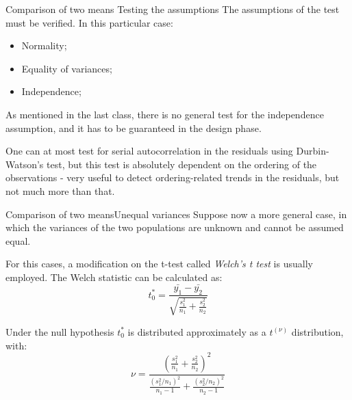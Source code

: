 \begin{frame}
{Comparison of two means}
{Testing the assumptions}
The assumptions of the test must be verified. In this particular case:

{\smaller
\begin{itemize}
  \item Normality;
  \item Equality of variances;
  \item \alert{Independence};
\end{itemize}}
\bigskip

As mentioned in the last class, there is no general test for the independence assumption, and it has to be guaranteed in the design phase.
\bigskip

One can at most test for serial autocorrelation in the residuals using Durbin-Watson's test, but this test is absolutely dependent on the ordering of the observations - very useful to detect ordering-related trends in the residuals, but not much more than that.
\end{frame}

\begin{frame}{Comparison of two means}{Unequal variances}
Suppose now a more general case, in which the variances of the two populations are unknown and cannot be assumed equal.
\bigskip

For this cases, a modification on the t-test called \textit{Welch's t test} is usually employed. The Welch statistic can be calculated as:
\begin{equation*}
  t^*_0 = \frac{\bar{y_1} - \bar{y_2}}{\sqrt{\frac{s_1^2}{n_1} + \frac{s_2^2}{n_2}}}
\end{equation*}
\bigskip

Under the null hypothesis $t^*_0$  is distributed approximately as a $t^{(\nu)}$ distribution, with:
\begin{equation*}
\nu = \frac{\left(\frac{s_1^2}{n_1} + \frac{s_2^2}{n_2}\right)^2}{\frac{\left(s_1^2/n_1\right)^2}{n_1-1} + \frac{\left(s_2^2/n_2\right)^2}{n_2-1}}
\end{equation*}
\end{frame}




